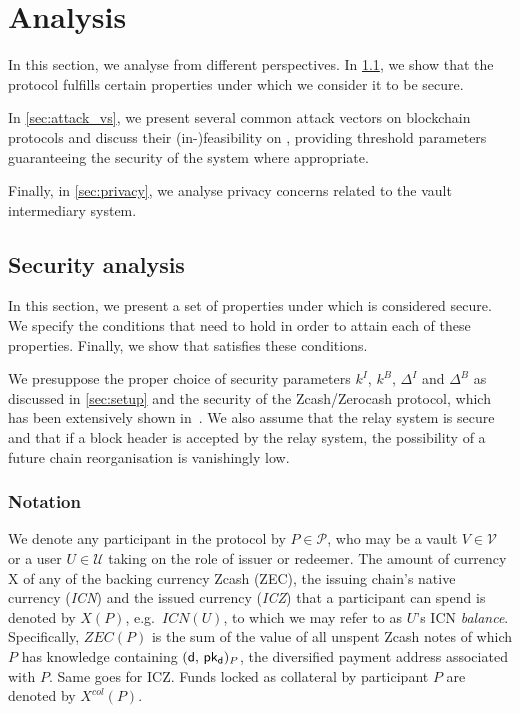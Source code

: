 
\chapter{Analysis}

In this section, we analyse \zclaim from different perspectives.
In \cref{sec:sec_analysis}, we show that the protocol fulfills certain properties under which we consider it to be secure.

In \cref{sec:attack_vs}, we present several common attack vectors on blockchain protocols and discuss their (in-)feasibility on \zclaim, providing thresh\-old parameters guaranteeing the security of the system where appropriate.

Finally, in \cref{sec:privacy}, we analyse privacy concerns related to the vault intermediary system.


\section{Security analysis}
\label{sec:sec_analysis}

In this section, we present a set of properties under which \zclaim is considered secure.
We specify the conditions that need to hold in order to attain each of these properties.
Finally, we show that \zclaim satisfies these conditions.

We presuppose the proper choice of security parameters $k^I$, $k^B$, $\Delta^I$ and $\Delta^B$ as discussed in \cref{sec:setup} and the security of the Zcash/Zerocash protocol, which has been extensively shown in~\cite{sasson2014zerocash}.
We also assume that the relay system is secure and that if a block header is accepted by the relay system, the possibility of a future chain reorganisation is vanishingly low.

\subsection{Notation}

We denote any participant in the protocol by $P \in \mathcal{P}$, who may be a vault $V \in \mathcal{V}$ or a user $U \in \mathcal{U}$ taking on the role of issuer or redeemer.
The amount of currency X of any of the backing currency Zcash (ZEC), the issuing chain's native currency (\emph{ICN}) and the issued currency (\emph{ICZ}) that a participant can spend is denoted by $X(P)$, e.g.\ $ICN(U)$, to which we may refer to as $U$'s ICN \emph{balance}.
Specifically, $ZEC(P)$ is the sum of the value of all unspent Zcash notes of which $P$ has knowledge containing $(\mathsf{d},\, \mathsf{pk_d})_P$, the diversified payment address associated with $P$.
Same goes for ICZ.
Funds locked as collateral by participant $P$ are denoted by $X^{col}(P)$.

